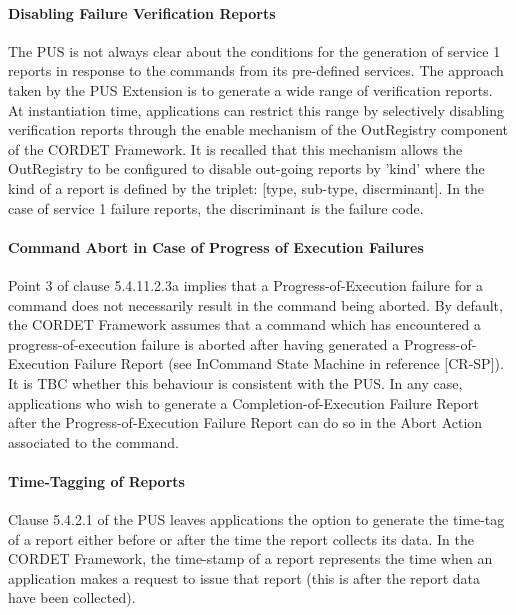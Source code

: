\documentclass{pnp_article}
\begin{document}
\paragraph{Disabling Failure Verification Reports} 
The PUS is not always clear about the conditions for the generation of service 1 reports in response to the commands from its pre-defined services. The approach taken by the PUS Extension is to generate a wide range of verification reports. At instantiation time, applications can restrict this range by selectively disabling verification reports through the enable mechanism of the OutRegistry component of the CORDET Framework. It is recalled that this mechanism allows the OutRegistry to be configured to disable out-going reports by 'kind' where the kind of a report is defined by the triplet: [type, sub-type, discrminant]. In the case of service 1 failure reports, the discriminant is the failure code. 
 
\paragraph{Command Abort in Case of Progress of Execution Failures}
Point 3 of clause 5.4.11.2.3a implies that a Progress-of-Execution failure for a command does not necessarily result in the command being aborted. By default, the CORDET Framework assumes that a command which has encountered a progress-of-execution failure is aborted after having generated a Progress-of-Execution Failure Report (see InCommand State Machine in reference [CR-SP]). It is TBC whether this behaviour is consistent with the PUS. In any case, applications who wish to generate a Completion-of-Execution Failure Report after the Progress-of-Execution Failure Report can do so in the Abort Action associated to the command.

\paragraph{Time-Tagging of Reports}
Clause 5.4.2.1 of the PUS leaves applications the option to generate the time-tag of a report either before or after the time the report collects its data. In the CORDET Framework, the time-stamp of a report represents the time when an application makes a request to issue that report (this is after the report data have been collected). 
\end{document}
